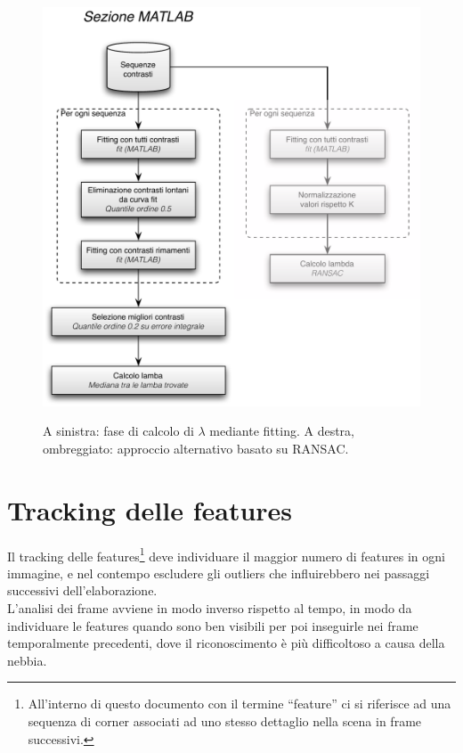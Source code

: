 \documentclass[12pt]{report}
\begin{document}
\begin{figure}[H]
	\centering 
	\includegraphics[scale=0.7]{images/schemaMatlab.pdf} 
	\label{diag:high}
	\caption{A sinistra: fase di calcolo di $\lambda$ mediante fitting. A destra, ombreggiato: approccio alternativo basato su RANSAC.}
\end{figure}




\section{Tracking delle features}
\label{sect:track}

\noindent Il tracking delle features\footnote{All'interno di questo documento con il termine ``feature'' ci si riferisce ad una sequenza di corner associati ad uno stesso dettaglio nella scena in frame successivi.} deve individuare il maggior numero di features in ogni immagine, e nel contempo escludere gli outliers che influirebbero nei passaggi successivi dell'elaborazione.\\
L'analisi dei frame avviene in modo inverso rispetto al tempo, in modo da individuare le features quando sono ben visibili per poi inseguirle nei frame temporalmente precedenti, dove il riconoscimento \`e pi\`u difficoltoso a causa della nebbia.\\
\end{document}
